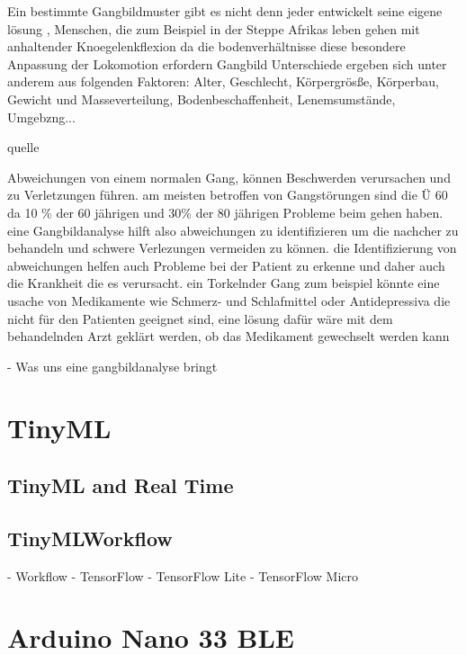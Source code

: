 \hfill \break
 Ein bestimmte Gangbildmuster gibt es nicht denn jeder entwickelt seine eigene lösung , Menschen, die zum Beispiel in der Steppe Afrikas leben gehen mit anhaltender Knoegelenkflexion da die bodenverhältnisse diese besondere Anpassung der Lokomotion erfordern
Gangbild Unterschiede ergeben sich unter anderem aus folgenden Faktoren: Alter, Geschlecht,  K\"orpergr\"osße, K\"orperbau, Gewicht und Masseverteilung, Bodenbeschaffenheit, Lenemsumstände, Umgebzng... 

quelle %


\hfill \break
Abweichungen von einem normalen Gang, können Beschwerden verursachen und zu Verletzungen führen. 
 am meisten betroffen von Gangstörungen sind die \"U 60 da 10 \% der 60 j\"ahrigen und 30\% der 80 j\"ahrigen 
 Probleme beim gehen haben.  \hfill \break
 eine Gangbildanalyse hilft also abweichungen zu identifizieren um die nachcher zu behandeln und schwere Verlezungen vermeiden zu k\"onnen.  \hfill \break
die Identifizierung von abweichungen helfen auch Probleme bei der Patient zu erkenne und daher auch die Krankheit die es verursacht.  \hfill \break
ein Torkelnder Gang zum beispiel k\"onnte eine usache von Medikamente wie Schmerz- und Schlafmittel oder Antidepressiva die nicht für den Patienten geeignet sind, eine l\"osung daf\"ur w\"are mit dem behandelnden Arzt gekl\"art werden, ob das Medikament gewechselt werden kann

- Was uns eine gangbildanalyse bringt 
\section{TinyML}
\subsection{TinyML and Real Time}
\subsection{TinyMLWorkflow}
- Workflow 
- TensorFlow
- TensorFlow Lite 
- TensorFlow Micro 
\section{Arduino Nano 33 BLE}
